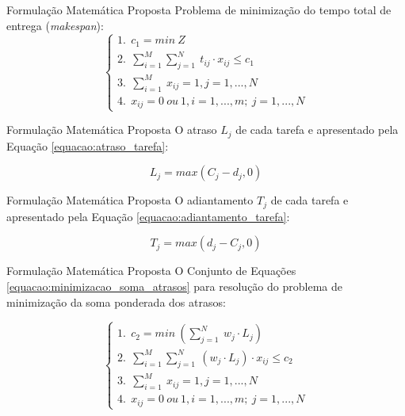 \documentclass[]{beamer}
\begin{document}
	\begin{frame}{Formulação Matemática Proposta}	
		Problema de minimização do tempo total de entrega (\textit{makespan}):
		\begin{equation}\label{equacao:minimizacao_tempo_entrega}
			\begin{cases}
				1. \ \ c_{1} = min \ Z  \\  
				2. \ \ \sum_{i=1}^M  \sum_{j=1}^N  \ t_{ij} \cdot x_{ij} \leq c_{1} \\
				3. \ \ \sum_{i=1}^M  \ x_{ij} = 1,j = 1, ...,N  \\
				4. \  \ x_{ij} = 0 \ ou \ 1,i = 1, ...,m;\ j = 1, ...,N 
			\end{cases}
		\end{equation}
	\end{frame}

	\begin{frame}{Formulação Matemática Proposta}	
		O atraso $L_{j}$ de cada tarefa e apresentado pela Equação \ref{equacao:atraso_tarefa}:

		\begin{equation} \label{equacao:atraso_tarefa}
			L_{j} = max(C_{j} - d_{j},0)
		\end{equation}
	\end{frame}

	\begin{frame}{Formulação Matemática Proposta}	
		O adiantamento $T_{j}$ de cada tarefa e apresentado pela Equação \ref{equacao:adiantamento_tarefa}:

		\begin{equation}\label{equacao:adiantamento_tarefa}
			T_{j} = max(d_{j} - C_{j},0)
		\end{equation}
	\end{frame}

	\begin{frame}{Formulação Matemática Proposta}	
		O Conjunto de Equações \ref{equacao:minimizacao_soma_atrasos} para
    resolução do problema de minimização da soma ponderada dos atrasos: 


		\begin{equation}\label{equacao:minimizacao_soma_atrasos}
			\begin{cases}
				1.\ \   c_{2} = min \ (\sum_{j=1}^N \ w_{j}   \cdot L_{j} ) \\ 
				2.\ \   \sum_{i=1}^M  \sum_{j=1}^N  \ (w_{j} \cdot L_{j}) \cdot x_{ij} \leq c_{2} \\
				3.\ \   \sum_{i=1}^M  \ x_{ij} = 1,j = 1, ...,N \\
				4.\ \   x_{ij} = 0 \ ou \ 1,i = 1, ...,m;\ j = 1, ...,N
			\end{cases}
		\end{equation}
	\end{frame}
\end{document}
